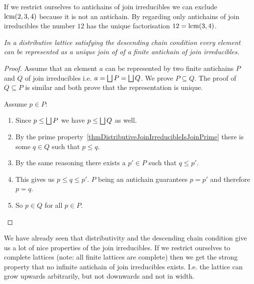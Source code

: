 If we restrict ourselves to antichains of join irreducibles we can exclude
$\text{lcm}(2,3,4)$ because it is not an antichain. By regarding only antichains of
join irreducibles the number $12$ has the unique factorisation $12 = \text{lcm}(3,4)$.

\begin{theorem}
    \label{thmDistributiveDCCUniqueJoin}
    \emph{
        In a distributive lattice satisfying the descending chain condition
        every element can be represented as a unique join of of a finite
        antichain of join irreducibles.
    }

    \begin{proof} Assume that an element
        $a$ can be represented by two finite antichains $P$ and $Q$ of join
        irreducibles i.e. $a = \bigsqcup P = \bigsqcup Q$. We prove $P \subseteq
        Q$. The proof of $Q \subseteq P$ is similar and both prove that the
        representation is unique.

        Assume $p \in P$:
        \begin{enumerate}
            \item Since $p \le \bigsqcup P$ we have $p \le \bigsqcup Q$ as well.

            \item By the prime
                property~\ref{thmDistributiveJoinIrreducibleIsJoinPrime}
                there is some $q \in Q$ such that $p \le q$.

            \item By the same reasoning there exists a $p' \in P$ such that $q \le
                p'$.

            \item This gives us $p \le q \le p'$. $P$ being an antichain
                guarantees $p = p'$ and therefore $p = q$.

            \item So $p \in Q$ for all $p \in P$.
        \end{enumerate}
    \end{proof}
\end{theorem}


We have already seen that distributivity and the descending chain condition give
us a lot of nice properties of the join irreducibles. If we restrict ourselves
to complete lattices (note: all finite lattices are complete) then we get the
strong property that no infinite antichain of join irreducibles exists. I.e. the
lattice can grow upwards arbitrarily, but not downwards and not in width.

